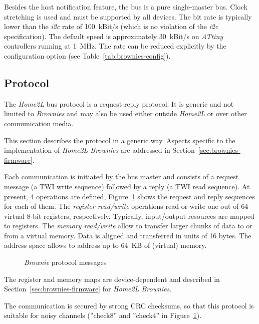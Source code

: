\documentclass[12pt,english,parskip=half,headheight=19pt]{scrreprt}
\newcommand{\figsvg}[2][]{}            %
\newcommand{\figsvg}[2][]{\href{#2}{}} %
\newcommand{\lst}[1]{\colorbox{lstbackground}{\footnotesize\code{#1}}}
\begin{document}
Besides the host notification feature, the bus is a pure single-master bus. Clock stretching is used and must be supported by all devices. The bit rate is typically lower than the \textit{i2c}
rate of 100~kBit/s (which is no violation of the \textit{i2c} specification). The default speed is approximately 30~kBit/s on \textit{ATtiny} controllers running at 1~MHz. The rate can be reduced explicitly by the \lst{hub_speed} configuration option (see Table~\ref{tab:brownies-config}).



\subsection{Protocol}
\label{sec:brownies-bus-protocol}

The \textit{Home2L} bus protocol is a request-reply protocol. It is generic and not limited to \textit{Brownies} and may also be used either outside \textit{Home2L} or over other communication media.

This section describes the protocol in a generic way. Aspects specific to the implementation of \textit{Home2L Brownies} are addressed in Section~\ref{sec:brownies-firmware}.

Each communication is initiated by the bus master and consists of a request message (a TWI write sequence) followed by a reply (a TWI read sequence). At present, 4 operations are defined, Figure~\ref{fig:brownies-protocol} shows the request and reply sequences for each of them.
The \textit{register read/write} operations read or write one out of 64 virtual 8-bit registers, respectively. Typically, input/output resources are mapped to registers.
The \textit{memory read/write} allow to transfer larger chunks of data to or from a virtual memory. Data is aligned and transferred in units of 16 bytes. The address space allows to address up to 64~KB of (virtual) memory.

\begin{figure}[ht]
  \centering
  \figsvg[width=\linewidth]{figs/brownies-protocol.svg}
  \caption[l]{\textit{Brownie} protocol messages}
  \label{fig:brownies-protocol}
\end{figure}

The register and memory maps are device-dependent and described in Section~\ref{sec:brownies-firmware} for \textit{Home2L Brownies}.

The communication is secured by strong CRC checksums, so that this protocol is suitable for noisy channels (''check8'' and ''check4'' in Figure~\ref{fig:brownies-protocol}).
\end{document}
